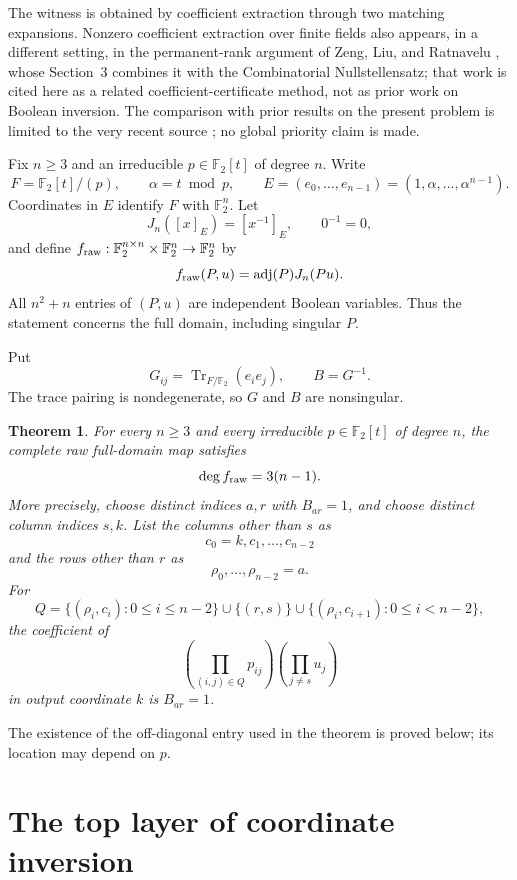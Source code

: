 \documentclass[11pt]{article}
\newtheorem{theorem}{Theorem}
\newcommand{\F}{\mathbb F}
\newcommand{\Tr}{\operatorname{Tr}}
\newcommand{\adj}{\operatorname{adj}}
\begin{document}
The witness is obtained by coefficient extraction through two matching
expansions.  Nonzero coefficient extraction over finite fields also appears,
in a different setting, in the permanent-rank argument of Zeng, Liu, and
Ratnavelu \cite{202608.1194}, whose Section~3 combines it with the
Combinatorial Nullstellensatz; that work is cited here
as a related coefficient-certificate method, not as prior work on Boolean
inversion.  The comparison with prior results on the present problem is
limited to the very recent source \cite{ZhangZhang2026}; no global priority
claim is made.

Fix $n\geq3$ and an irreducible $p\in\F_2[t]$ of degree $n$.  Write
\[
 F=\F_2[t]/(p),\qquad \alpha=t\bmod p,
 \qquad E=(e_0,\ldots,e_{n-1})=(1,\alpha,\ldots,\alpha^{n-1}).
\]
Coordinates in $E$ identify $F$ with $\F_2^n$.  Let
\[
 J_n([x]_E)=[x^{-1}]_E,\qquad 0^{-1}=0,
\]
and define $f_{\rm raw}:\F_2^{n\times n}\times\F_2^n\to\F_2^n$ by
\[
 f_{\rm raw}(P,u)=\adj(P)J_n(Pu).
\]
All $n^2+n$ entries of $(P,u)$ are independent Boolean variables.  Thus
the statement concerns the full domain, including singular $P$.

Put
\[
 G_{ij}=\Tr_{F/\F_2}(e_i e_j),\qquad B=G^{-1}.
\]
The trace pairing is nondegenerate, so $G$ and $B$ are nonsingular.

\begin{theorem}\label{thm:main}
For every $n\geq3$ and every irreducible $p\in\F_2[t]$ of degree $n$,
the complete raw full-domain map satisfies
\[
                         \deg f_{\rm raw}=3(n-1).
\]
More precisely, choose distinct indices $a,r$ with $B_{ar}=1$, and choose
distinct column indices $s,k$.  List the columns other than $s$ as
\[
 c_0=k,c_1,\ldots,c_{n-2}
\]
and the rows other than $r$ as
\[
 \rho_0,\ldots,\rho_{n-2}=a.
\]
For
\[
 Q=\{(\rho_i,c_i):0\leq i\leq n-2\}
   \cup\{(r,s)\}
   \cup\{(\rho_i,c_{i+1}):0\leq i<n-2\},                 \tag{1}
\]
the coefficient of
\[
 \left(\prod_{(i,j)\in Q}p_{ij}\right)
 \left(\prod_{j\ne s}u_j\right)                         \tag{2}
\]
in output coordinate $k$ is $B_{ar}=1$.
\end{theorem}

The existence of the off-diagonal entry used in the theorem is proved
below; its location may depend on $p$.

\section{The top layer of coordinate inversion}
\end{document}
